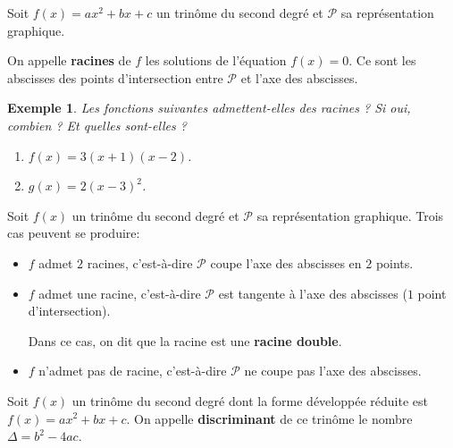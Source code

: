 \documentclass[a4paper,11pt]{article}
\theoremstyle{break}
\newtheorem{exemple}{Exemple}
\begin{document}
  
  \begin{definition}
    Soit $f(x)=ax^2+bx+c$ un trinôme du second degré et $\mathcal{P}$ sa représentation 
    graphique.
    
    On appelle \textbf{racines} de $f$ les solutions de l'équation $f(x)=0$. Ce sont les 
    abscisses des points d'intersection entre $\mathcal{P}$ et l'axe des abscisses.
    
  \end{definition}
  
  \begin{exemple}
    Les fonctions suivantes admettent-elles des racines ? Si oui, combien ? 
    Et quelles sont-elles ?
    \begin{enumerate}
     \item $f(x)=3(x+1)(x-2)$. 
     \item $g(x)=2(x-3)^2$.
    \end{enumerate}
  \end{exemple}
  
  \begin{proposition}
   Soit $f(x)$ un trinôme du second degré et $\mathcal{P}$ sa représentation graphique.
    Trois cas peuvent se produire:
   
   \begin{itemize}
    \item $f$ admet $2$ racines, c'est-à-dire $\mathcal{P}$ coupe l'axe des abscisses 
    en $2$ points.
    \item $f$ admet une racine, c'est-à-dire $\mathcal{P}$ est tangente à l'axe
    des abscisses ($1$ point d'intersection).
    
    Dans ce cas, on dit que la racine est une \textbf{racine double}.
    
    \item $f$ n'admet pas de racine, c'est-à-dire $\mathcal{P}$ ne coupe pas l'axe des abscisses.
   \end{itemize}
   
  \end{proposition}
  
  \vspace{10cm}
  
  
  
  \begin{definition}[Discriminant]
    Soit $f(x)$ un trinôme du second degré dont la forme développée réduite
    est $f(x)=ax^2+bx+c$. On appelle \textbf{discriminant} de ce trinôme
    le nombre $\Delta=b^2-4ac$.
    
    
  \end{definition}
  
\end{document}
